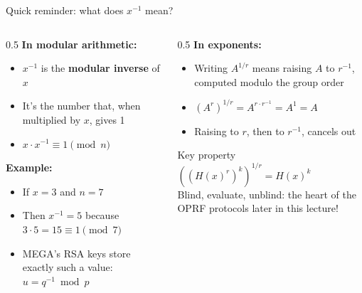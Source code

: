 \ifdefined\PRESENTATION\else\PassOptionsToClass{handout}{beamer}\fi\documentclass[aspectratio=169, lualatex]{beamer}
\begin{document}
\begin{frame}{Quick reminder: what does $x^{-1}$ mean?}
	\begin{columns}[c]
		\begin{column}{0.5\textwidth}
			\textbf{In modular arithmetic:}
			\begin{itemize}
				\item $x^{-1}$ is the \textbf{modular inverse} of $x$
				\item It's the number that, when multiplied by $x$, gives 1
				\item $x \cdot x^{-1} \equiv 1 \pmod{n}$
			\end{itemize}
			\vspace{0.5em}
			\textbf{Example:}
			\begin{itemize}
				\item If $x = 3$ and $n = 7$
				\item Then $x^{-1} = 5$ because $3 \cdot 5 = 15 \equiv 1 \pmod{7}$
				\item MEGA's RSA keys store exactly such a value: $u = q^{-1} \bmod p$
			\end{itemize}
		\end{column}
		\begin{column}{0.5\textwidth}
			\textbf{In exponents:}
			\begin{itemize}
				\item Writing $A^{1/r}$ means raising $A$ to $r^{-1}$, computed modulo the group order
				\item $(A^{r})^{1/r} = A^{r \cdot r^{-1}} = A^{1} = A$
				\item Raising to $r$, then to $r^{-1}$, cancels out
			\end{itemize}
			\vspace{0.5em}
			\begin{alertblock}{Key property}
				$((H(x)^{r})^{k})^{1/r} = H(x)^{k}$ \\
				Blind, evaluate, unblind: the heart of the OPRF protocols later in this lecture!
			\end{alertblock}
		\end{column}
	\end{columns}
\end{frame}
\end{document}
